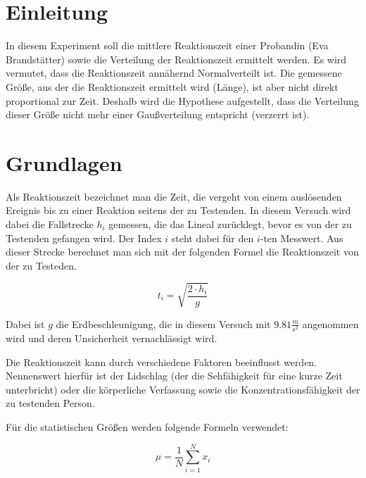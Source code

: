 \documentclass[a4paper,12pt]{article}
\begin{document}
\tableofcontents
\newpage


\section{Einleitung}

In diesem Experiment soll die mittlere Reaktionszeit einer Probandin (Eva Brandstätter) sowie die Verteilung 
der Reaktionszeit ermittelt werden. 
Es wird vermutet, dass die Reaktionszeit annähernd Normalverteilt ist. Die gemessene Größe, aus der die
Reaktionszeit ermittelt wird (Länge), ist aber nicht direkt proportional zur Zeit. Deshalb wird die 
Hypothese aufgestellt, dass die Verteilung dieser Größe nicht mehr einer Gaußverteilung entspricht (verzerrt ist).

\section{Grundlagen}

Als Reaktionszeit bezeichnet man die Zeit, die vergeht von einem auslösenden Ereignis bis zu einer Reaktion seitens der zu Testenden.
In diesem Versuch wird dabei die Fallstrecke $h_i$ gemessen, die das Lineal zurücklegt, bevor es von der zu Testenden gefangen wird.
Der Index $i$ steht dabei für den $i$-ten Messwert.  
Aus dieser Strecke berechnet man sich mit der folgenden Formel die Reaktionszeit von der zu Testeden.

\begin{equation}
    t_i = \sqrt{\frac{2 \cdot h_i}{g}}
\end{equation}

Dabei ist $g$ die Erdbeschleunigung, die in diesem Versuch mit $9.81 \frac{m}{s^2}$ angenommen wird und deren Unsicherheit
vernachlässigt wird. 

Die Reaktionszeit kann durch verschiedene Faktoren beeinflusst werden. Nennenswert hierfür ist der Lidschlag (der die Sehfähigkeit 
für eine kurze Zeit unterbricht) oder die körperliche Verfassung sowie die Konzentrationsfähigkeit der zu testenden Person.

Für die statistischen Größen werden folgende Formeln verwendet:

\begin{equation}
    \label{eq:mittelwert}
    \mu = \frac{1}{N} \sum_{i=1}^{N} x_i
\end{equation}
\end{document}
